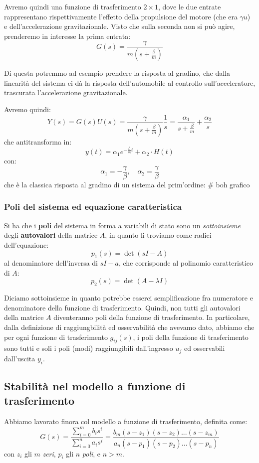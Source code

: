 \documentclass[a4paper,11pt]{article}
\begin{document}
Avremo quindi una funzione di trasferimento $2\times 1$, dove le due entrate rappresentano rispettivamente l'effetto della propulsione del motore (che era $\gamma u$) e dell'accelerazione gravitazionale.
Visto che sulla seconda non si può agire, prenderemo in interesse la prima entrata:
$$
G(s) = \frac{\gamma}{m \left( s + \frac{\beta}{m} \right)}
$$

Di questa potremmo ad esempio prendere la risposta al gradino, che dalla linearità del sistema ci dà la risposta dell'automobile al controllo sull'acceleratore, trascurata l'accelerazione gravitazionale.

Avremo quindi:
$$
Y(s) = G(s) U(s) = \frac{\gamma}{m \left( s + \frac{\beta}{m} \right)} \frac{1}{s} = \frac{\alpha_1}{s + \frac{\beta}{m}} + \frac{\alpha_2}{s}
$$
che antitransforma in:
$$
y(t) = \alpha_1 e^{-\frac{\beta}{m} t} + \alpha_2 \cdot H(t)
$$
con:
$$
\alpha_1 = - \frac{\gamma}{\beta}, \quad \alpha_2 = \frac{\gamma}{\beta}
$$
che è la classica risposta al gradino di un sistema del prim'ordine:
# boh grafico

\subsubsection{Poli del sistema ed equazione caratteristica}
Si ha che i \textbf{poli} del sistema in forma a variabili di stato sono un \textit{sottoinsieme} degli \textbf{autovalori} della matrice $A$, in quanto li troviamo come radici dell'equazione:
$$
p_1(s) = \det(sI - A)
$$
al denominatore dell'inversa di $sI - a$, che corrisponde al polinomio caratteristico di $A$:
$$
p_2(s) = \det(A - \lambda I)
$$

Diciamo sottoinsieme in quanto potrebbe esserci semplificazione fra numeratore e denominatore della funzione di trasferimento.
Quindi, non tutti gli autovalori della matrice $A$ diventeranno poli della funzione di trasferimento.
In particolare, dalla definizione di raggiungbilità ed osservabilità che avevamo dato, abbiamo che per ogni funzione di trasferimento $g_{ij}(s)$, i poli della funzione di trasferimento sono tutti e soli i poli (modi) raggiungibili dall'ingresso $u_j$ ed osservabili dall'uscita $y_i$.

\subsection{Stabilità nel modello a funzione di trasferimento}
Abbiamo lavorato finora col modello a funzione di trasferimento, definita come:
$$
G(s) = \frac{\sum_{i = 0}^m b_i s^i}{\sum_{i = 0}^n a_i s^i} = \frac{ b_m (s - z_1) (s - z_2) ... (s - z_m) }{ a_n (s - p_1) (s - p_2) ... (s - p_n) }
$$
con $z_i$ gli $m$ \textit{zeri}, $p_i$ gli $n$ \textit{poli}, e $n > m$.
\end{document}
